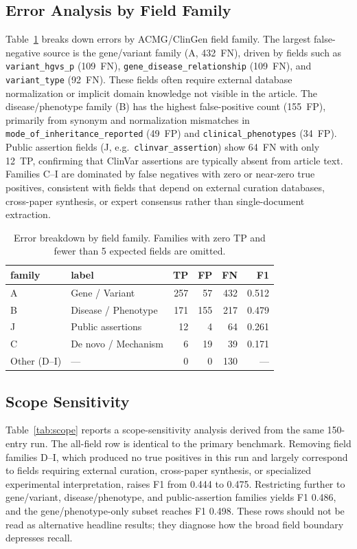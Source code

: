 \documentclass[conference]{IEEEtran}
\begin{document}
\subsection{Error Analysis by Field Family}
Table~\ref{tab:error} breaks down errors by ACMG/ClinGen field family. The largest false-negative source is the gene/variant family (A, 432~FN), driven by fields such as \texttt{variant\_hgvs\_p} (109~FN), \texttt{gene\_disease\_relationship} (109~FN), and \texttt{variant\_type} (92~FN). These fields often require external database normalization or implicit domain knowledge not visible in the article. The disease/phenotype family (B) has the highest false-positive count (155~FP), primarily from synonym and normalization mismatches in \texttt{mode\_of\_inheritance\_reported} (49~FP) and \texttt{clinical\_phenotypes} (34~FP). Public assertion fields (J, e.g.\ \texttt{clinvar\_assertion}) show 64~FN with only 12~TP, confirming that ClinVar assertions are typically absent from article text. Families C--I are dominated by false negatives with zero or near-zero true positives, consistent with fields that depend on external curation databases, cross-paper synthesis, or expert consensus rather than single-document extraction.

\begin{table}[t]
\centering
\caption{Error breakdown by field family. Families with zero TP and fewer than 5 expected fields are omitted.}
\label{tab:error}
\setlength{\tabcolsep}{4pt}
\renewcommand{\arraystretch}{1.08}
\small
\begin{tabular}{llrrrr}
\toprule
family & label & TP & FP & FN & F1 \\
\midrule
A & Gene / Variant & 257 & 57 & 432 & 0.512 \\
B & Disease / Phenotype & 171 & 155 & 217 & 0.479 \\
J & Public assertions & 12 & 4 & 64 & 0.261 \\
C & De novo / Mechanism & 6 & 19 & 39 & 0.171 \\
\midrule
Other (D--I) & --- & 0 & 0 & 130 & --- \\
\bottomrule
\end{tabular}
\end{table}

\subsection{Scope Sensitivity}
Table~\ref{tab:scope} reports a scope-sensitivity analysis derived from the same 150-entry run. The all-field row is identical to the primary benchmark. Removing field families D--I, which produced no true positives in this run and largely correspond to fields requiring external curation, cross-paper synthesis, or specialized experimental interpretation, raises F1 from 0.444 to 0.475. Restricting further to gene/variant, disease/phenotype, and public-assertion families yields F1 0.486, and the gene/phenotype-only subset reaches F1 0.498. These rows should not be read as alternative headline results; they diagnose how the broad field boundary depresses recall.
\end{document}
